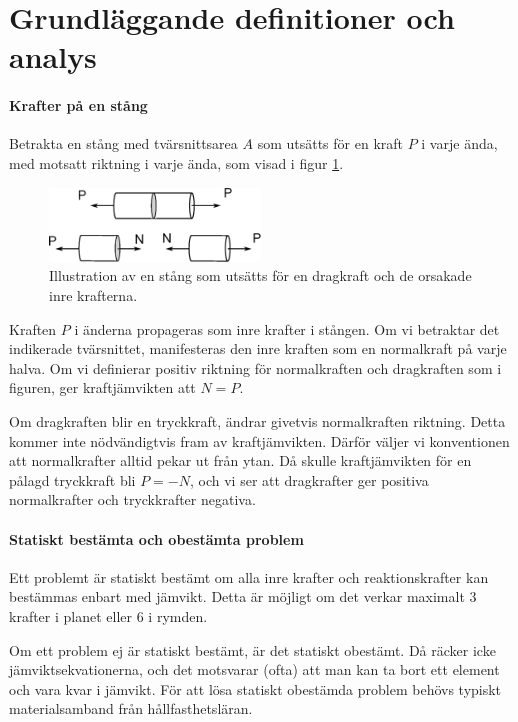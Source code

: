 \section{Grundläggande definitioner och analys}

\paragraph{Krafter på en stång}
Betrakta en stång med tvärsnittsarea $A$ som utsätts för en kraft $P$ i varje ända, med motsatt riktning i varje ända, som visad i figur \ref{fig:cylinder_forces}.
\begin{figure}[!ht]
	\centering
	\includegraphics[width = 0.5\textwidth]{./Images/cylinder_forces.eps}
	\caption{Illustration av en stång som utsätts för en dragkraft och de orsakade inre krafterna.}
	\label{fig:cylinder_forces}
\end{figure}

Kraften $P$ i änderna propageras som inre krafter i stången. Om vi betraktar det indikerade tvärsnittet, manifesteras den inre kraften som en normalkraft på varje halva. Om vi definierar positiv riktning för normalkraften och dragkraften som i figuren, ger kraftjämvikten att $N = P$.

Om dragkraften blir en tryckkraft, ändrar givetvis normalkraften riktning. Detta kommer inte nödvändigtvis fram av kraftjämvikten. Därför väljer vi konventionen att normalkrafter alltid pekar ut från ytan. Då skulle kraftjämvikten för en pålagd tryckkraft bli $P = -N$, och vi ser att dragkrafter ger positiva normalkrafter och tryckkrafter negativa.

\paragraph{Statiskt bestämta och obestämta problem}
Ett problemt är statiskt bestämt om alla inre krafter och reaktionskrafter kan bestämmas enbart med jämvikt. Detta är möjligt om det verkar maximalt $3$ krafter i planet eller $6$ i rymden.

Om ett problem ej är statiskt bestämt, är det statiskt obestämt. Då räcker icke jämviktsekvationerna, och det motsvarar (ofta) att man kan ta bort ett element och vara kvar i jämvikt. För att lösa statiskt obestämda problem behövs typiskt materialsamband från hållfasthetsläran.

